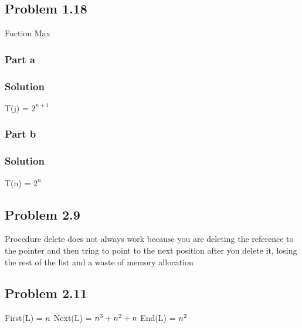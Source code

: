 \documentclass[10pt,letterpaper,oneside]{article}
\newcommand{\Problem}[1]{\subsection*{Problem #1}}
\newcommand{\Part}[1]{\subsubsection*{Part #1}}
\newcommand{\Solution}{\subsubsection*{Solution}}
\begin{document}
\Problem {1.18}
	Fuction Max
	\Part{a}
	\Solution
	T(j) = $2^{n+1}$

	\Part{b}
	\Solution
	T(n) = $2^{n}$




\Problem {2.9}
Procedure delete does not always work because you are deleting the reference to the pointer and then tring to point to the next position after you delete it, losing the rest of the list and a waste of memory allocation




\Problem {2.11}
First(L) = $n\\$
Next(L) = $n^3 + n^2 + n\\$
End(L) = $n^2\\$
\end{document}
